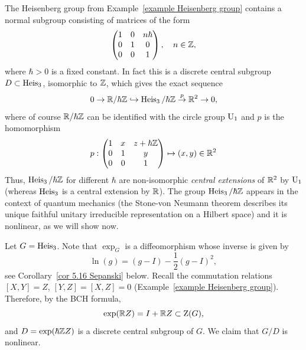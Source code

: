 \begin{example}\label{example quantum heisenberg}
    The Heisenberg group from Example~\ref{example Heisenberg group} contains a normal subgroup consisting of matrices of the form
    \[
    \begin{pmatrix}
        1&0&n\hbar\\
        0&1&0\\
        0&0&1
    \end{pmatrix},\quad n\in\mathbb{Z},
    \]
    where $\hbar >0$ is a fixed constant. In fact this is a discrete central subgroup $D\subset \operatorname{Heis}_3$, isomorphic to $\mathbb{Z}$, which gives the exact sequence
    \[0\to \mathbb{R}\slash \hbar\mathbb{Z}\hookrightarrow \operatorname{Heis}_3\slash \hbar\mathbb{Z} \overset{p}{\to} \mathbb{R}^2\to 0,\]
    where of course $\mathbb{R}\slash\hbar\mathbb{Z}$ can be identified with the circle group $\operatorname{U}_1$ and $p$ is the homomorphism
    \[p: 
     \begin{pmatrix}
        1&x&z+\hbar\mathbb{Z}\\
        0&1&y\\
        0&0&1
    \end{pmatrix}
    \mapsto (x,y)\in\mathbb{R}^2
    \]
    Thus, $\operatorname{Heis}_3\slash\hbar \mathbb{Z}$ for different $\hbar$ are non-isomorphic \emph{central extensions} of $\mathbb{R}^2$ by $\operatorname{U}_1$ (whereas $\operatorname{Heis}_3$ is a central extension by $\mathbb{R}$). The group $\operatorname{Heis}_3\slash \hbar\mathbb{Z}$ appears in the context of quantum mechanics (the Stone-von Neumann theorem describes its unique faithful unitary irreducible representation on a Hilbert space) and it is nonlinear, as we will show now.
    
    Let $G=\operatorname{Heis}_3$. Note that $\exp_G$ is a diffeomorphism whose inverse is given by 
    \[\ln(g)=(g-I)-\frac12(g-I)^2,\]
    see Corollary~\ref{cor 5.16 Sepanski} below. Recall the commutation relations $[X,Y]=Z$, $[Y,Z]=[X,Z]=0$ (Example~\ref{example Heisenberg group}). Therefore, by the BCH formula,
    \[\exp(\mathbb{R} Z)=I+\mathbb{R} Z\subset \mathrm{Z}(G),\]
    and $D=\exp(\hbar\mathbb{Z} Z)$ is a discrete central subgroup of $G$. We claim that $G\slash D$ is nonlinear.


\end{example}
